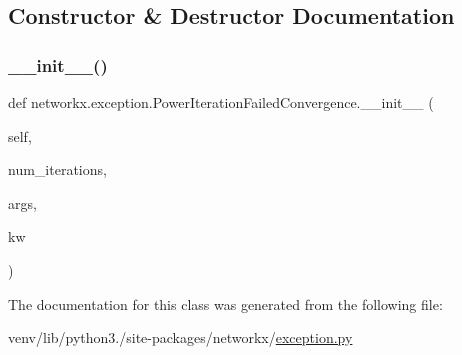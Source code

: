 \subsection{Constructor \& Destructor Documentation}
\mbox{\label{classnetworkx_1_1exception_1_1PowerIterationFailedConvergence_ac13f5c53d61f87cb78591216735079c5}} 
\subsubsection{\texorpdfstring{\+\_\+\+\_\+init\+\_\+\+\_\+()}{\_\_init\_\_()}}
{\footnotesize\ttfamily def networkx.\+exception.\+Power\+Iteration\+Failed\+Convergence.\+\_\+\+\_\+init\+\_\+\+\_\+ (\begin{DoxyParamCaption}\item[{}]{self,  }\item[{}]{num\+\_\+iterations,  }\item[{}]{args,  }\item[{}]{kw }\end{DoxyParamCaption})}



The documentation for this class was generated from the following file\+:\begin{DoxyCompactItemize}
\item 
venv/lib/python3./site-\/packages/networkx/\hyperlink{exception_8py}{exception.\+py}\end{DoxyCompactItemize}
